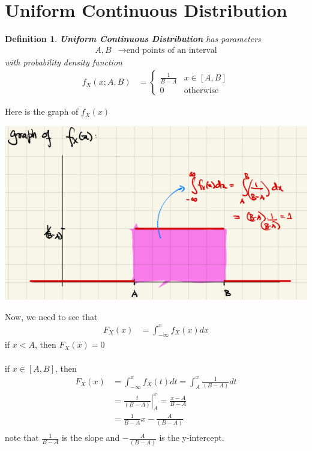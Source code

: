 \documentclass[11pt,oneside]{book}
\theoremstyle{break}
\theoremstyle{break}
\newtheorem{defn}{Definition}[corL]
\begin{document}
\section[Uniform Continuous Distribution]{Uniform Continuous Distribution}
\begin{defn}
\textbf{Uniform Continuous Distribution} has parameters \begin{align*}
A,B&\rightarrow \text{end points of an interval}
\end{align*}
with probability density function\begin{align*}
f_X(x;A,B)&=\begin{cases}\frac{1}{B-A} & x\in [A,B]\\ 0 & \text{otherwise}\end{cases}
\end{align*}
\end{defn}
Here is the graph of $f_X(x)$\begin{center}
\includegraphics[scale=0.5]{figures/uniform_cont_graph}
\end{center}
Now, we need to see that \begin{align*}
F_X(x)&=\int_{-\infty}^{x}f_X(x)dx
\end{align*}
if $x<A$, then $F_X(x)=0$\\
\hfill\\
if $x\in [A,B]$, then\begin{align*}
F_X(x)&=\int_{-\infty}^{x}f_X(t)dt=\int_{A}^{x}\frac{1}{(B-A)}dt\\
&=\left. \frac{t}{(B-A)}\right|_{A}^{x} =\frac{x-A}{B-A}\\
&=\frac{1}{B-A}x-\frac{A}{(B-A)}\\
\end{align*} 
note that $\frac{1}{B-A}$ is the slope and $-\frac{A}{(B-A)}$ is the y-intercept.\\
\end{document}
